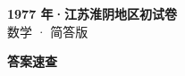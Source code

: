 \documentclass[zihao=-4, a4paper]{ctexart}
\begin{document}
\begin{center}
  {\Large\bfseries 1977 年·江苏淮阴地区初试卷}\\[4pt]
  {\large 数学 · 简答版}
\end{center}
\medskip
{}

\clearpage
{}
\begin{center}{\Large\bfseries 答案速查}\end{center}
\medskip

\end{document}
